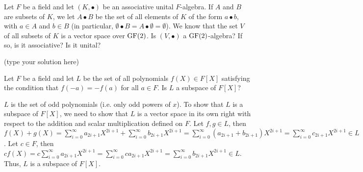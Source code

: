 \maketitle

\begin{ProbBox} %
\begin{problem}[Golan 124]
Let $F$ be a field and let $(K, \bullet)$ be an associative unital
$F$-algebra.  If $A$ and $B$ are subsets of $K$, we let $A\bullet B$ be the set
of all elements of $K$ of the form $a \bullet b$, with $a \in A$ and $b \in B$
(in particular, $\emptyset \bullet B = A \bullet \emptyset = \emptyset$).
We know that the set $V$ of all subsets of $K$ is a vector space over $\operatorname{GF}(2)$.
Is $(V, \bullet)$ a $\operatorname{GF}(2)$-algebra?  If so, is it associative?  Is it unital?
\end{problem}
\smallskip
\begin{solution}
(type your solution here)
\end{solution}
\end{ProbBox}
\probskip

\begin{ProbBox} %
\begin{problem}[Golan 132]
Let $F$ be a field and let $L$ be the set of all polynomials $f(X) \in F[X]$
satisfying the condition that $f(-a) = -f(a)$ for all $a\in F$.  Is $L$ a
subspace of $F[X]$?
\end{problem}
\smallskip
\begin{solution}
$L$ is the set of odd polynomials (i.e. only odd powers of $x$). To show that $L$ is a subspace of $F[X]$, we need to show that $L$ is a vector space in its own right with respect to the addition and scalar multiplication defined on $F$. Let $f,g \in L$, then $f(X)+g(X)=\sum\limits_{i=0}^\infty a_{2i+1}X^{2i+1} + \sum\limits_{i=0}^\infty b_{2i+1}X^{2i+1} = \sum\limits_{i=0}^\infty (a_{2i+1} + b_{2i+1})X^{2i+1} = \sum\limits_{i=0}^\infty c_{2i+1}X^{2i+1} \in L$. Let $c \in F$, then $cf(X) = c\sum\limits_{i=0}^\infty a_{2i+1}X^{2i+1} = \sum\limits_{i=0}^\infty ca_{2i+1}X^{2i+1} = \sum\limits_{i=0}^\infty b_{2i+1}X^{2i+1} \in L$. Thus, $L$ is a subspace of $F[X]$.
\end{solution}
\end{ProbBox}
\probskip

